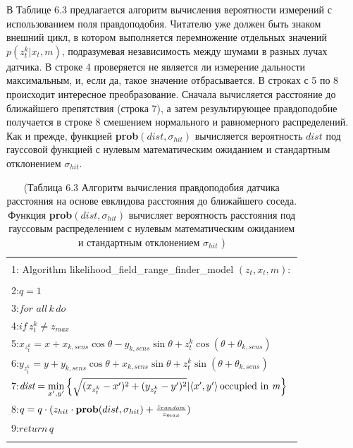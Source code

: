\documentclass[10pt,a4paper]{article}
\begin{document}
В Таблице 6.3 предлагается алгоритм вычисления вероятности измерений с использованием поля правдоподобия. Читателю уже должен быть знаком внешний цикл, в котором выполняется перемножение отдельных значений $p(z_t^k | x_t, m)$, подразумевая независимость между шумами в разных лучах датчика. В строке 4 проверяется не является ли измерение дальности максимальным, и, если да, такое значение отбрасывается. В строках с 5 по 8 происходит интересное преобразование. Сначала вычисляется расстояние до ближайшего препятствия (строка 7), а затем результирующее правдоподобие получается в строке 8 смешением нормального и равномерного распределений. Как и прежде, функцией \textbf{prob}$(dist, \sigma_{hit})$ вычисляется вероятность $dist$ под гауссовой функцией с нулевым математическим ожиданием и стандартным отклонением $\sigma_{hit}$.

\begin{table}[H]
\begin{center}
\begin{tabular}{|l|}
\hline
{}\\
1: \hspace{3mm} Algorithm likelihood\_field\_range\_finder\_model $(z_t,x_t,m):$ \\
{}\\
2:\hspace{7mm}$q=1$\\
3:\hspace{7mm}$\textit{for all} \,k\,\textit{do}$\\
4:\hspace{12mm}$\textit{if}\,z_t^k\neq z_{max}$\\
5:\hspace{17mm}$x_{z_t^k}=x+x_{k,sens}\cos\theta-y_{k,sens}\sin\theta+z_t^k\cos(\theta+\theta_{k,sens})$\\
6:\hspace{17mm}$y_{z_t^k}=y+y_{k,sens}\cos\theta+x_{k,sens}\sin\theta+z_t^k\sin(\theta+\theta_{k,sens})$\\
7:\hspace{17mm}$\textit{dist}=\underset{x',y'}{\min}\left\lbrace \sqrt{(x_{z_t^k}-x')^2+(y_{z_t^k}-y')^2}|\langle x',y'\rangle\,\text{occupied in \textit{m}}\right\rbrace $\\
8:\hspace{17mm}$q=q\cdot(z_{hit}\cdot\text{\textbf{prob}}(dist,\sigma_{hit})+\frac{z_{random}}{z_{max}})$\\
9:\hspace{7mm}$\textit{return}\,q$\\
{}\\
\hline
\end{tabular}
\caption{(Таблица 6.3 Алгоритм вычисления правдоподобия датчика расстояния на основе евклидова расстояния до ближайшего соседа. Функция \textbf{prob}$(\textit{dist}, \sigma_{hit})$ вычисляет вероятность расстояния под гауссовым распределением с нулевым математическим ожиданием и стандартным отклонением $\sigma_{hit}$ )}
\end{center}
\end{table}
\end{document}

